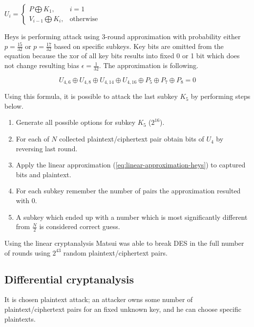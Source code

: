 \documentclass[
    digital,    %
    oneside,    %
    color,
    11pt,
    nocover,
    notable,
    nolof,
    nolot,
    final
]{fithesis3}
\renewcommand\_{\textunderscore\allowbreak}
\begin{document}
\begin{description}
\begin{itemize}
		$U_{i} = \begin{cases}
		P \bigoplus K_{1}, & i = 1 \\
		V_{i-1} \bigoplus K_{i}, & \text{otherwise}
		\end{cases}
		$
	\end{itemize}

	Heys is performing attack using 3-round approximation with probability either $p = \frac{15}{32}$ or $p = \frac{17}{32}$ based on specific subkeys. Key bits are omitted from the equation because the xor of all key bits results into fixed 0 or 1 bit which does not change resulting bias $\epsilon = \frac{1}{32}$. The approximation is following.   
	
	\begin{equation}
	U_{4,6} \oplus U_{4,8} \oplus U_{4,14} \oplus U_{4,16} \oplus P_{5} \oplus P_{7} \oplus P_{8} = 0
	\label{eq:linear-approximation-heys}
	\end{equation}
	
	Using this formula, it is possible to attack the last subkey $K_5$ by performing steps below.
	
	\begin{enumerate}
		\item Generate all possible options for subkey $K_{5}$ ($2^{16}$).
		\item For each of $N$ collected plaintext/ciphertext pair obtain bits of $U_{4}$ by reversing last round. 
		\item Apply the linear approximation (\cref{eq:linear-approximation-heys}) to captured bits and plaintext.
		\item For each subkey remember the number of pairs the approximation resulted with 0.  
		\item A subkey which ended up with a number which is most significantly different from $\frac{N}{2}$ is considered correct guess.
	\end{enumerate}
\end{description}

Using the linear cryptanalysis Matsui \cite{matsuiAttack} was able to break DES in the full number of rounds using $2^{43}$ random plaintext/ciphertext pairs.

\subsection{Differential cryptanalysis}

It is chosen plaintext attack; an attacker owns some number of plaintext/ciphertext pairs for an fixed unknown key, and he can choose specific plaintexts. 
\end{document}
